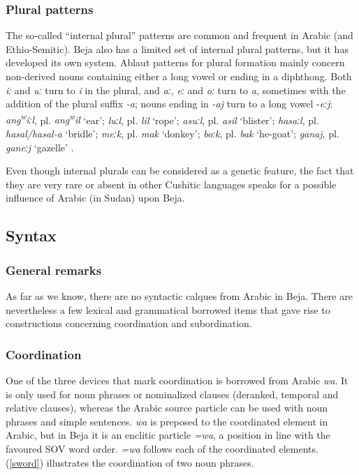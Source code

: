\documentclass[output=paper]{langsci/langscibook}
\begin{document}
 \subsubsection{Plural patterns}

The so-called “internal plural” patterns are common and frequent in Arabic (and Ethio-Semitic). Beja also has a limited set of internal plural patterns, but it has developed its own system. Ablaut patterns for plural formation mainly concern non-derived nouns containing either a long vowel or ending in a diphthong. Both \textit{iː} and \textit{uː} turn to \textit{i} in the plural, and \textit{aː,} \textit{eː} and \textit{oː} turn to \textit{a}, sometimes with the addition of the plural suffix \textit{{}-}\textit{a}; nouns ending in \textit{{}-}\textit{aj} turn to a long vowel \nobreakdash-\textit{eːj}:  \textit{ang\textsuperscript{w}}\textit{iːl}, pl. \textit{ang\textsuperscript{w}}\textit{il} ‘ear’; \textit{luːl}, pl. \textit{lil} ‘rope’; \textit{asuːl}, pl. \textit{asil} ‘blister’; \textit{hasaːl}, pl. \textit{hasal/hasal-a} ‘bridle’; \textit{meːk}, pl. \textit{mak} ‘donkey’; \textit{boːk}, pl. \textit{bak} ‘he-goat’; \textit{ganaj}, pl. \textit{ganeːj} ‘gazelle’ \citep{Vanhove2017}. 

Even though internal plurals can be considered as a genetic feature, the fact that they are very rare or absent in other Cushitic languages \citep{Zaborski1986} speaks for a possible influence of Arabic (in Sudan) upon Beja.


 
 \subsection{Syntax}
 \subsubsection{General remarks}

As far as we know, there are no syntactic calques from Arabic in Beja. There are nevertheless a few lexical and grammatical borrowed items that gave rise to constructions concerning coordination and subordination.


 \subsubsection{Coordination}

One of the three devices that mark coordination is borrowed from Arabic \textit{wa}. It is only used for noun phrases or nominalized clauses (deranked, temporal and relative clauses), whereas the Arabic source particle can be used with noun phrases and simple sentences. \textit{wa} is preposed to the coordinated element in Arabic, but in Beja it is an enclitic particle \textit{=wa}, a position in line with the favoured SOV word order. \textit{=wa} follows each of the coordinated elements. (\ref{sword}) illustrates the coordination of two noun phrases.
\end{document}
